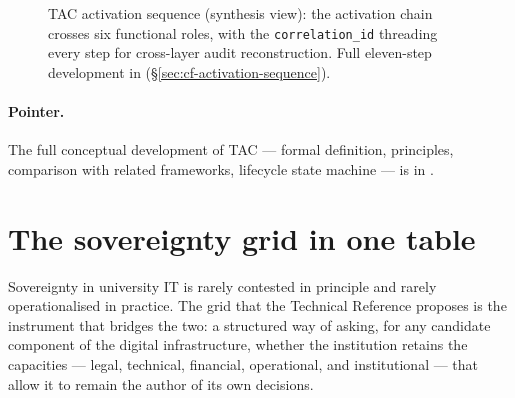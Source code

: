 \begin{figure}[H]
\centering
{}
\caption{TAC activation sequence (synthesis view): the activation
chain crosses six functional roles, with the
\texttt{correlation\_id} threading every step for cross-layer
audit reconstruction. Full eleven-step development in
 (\S\ref{sec:cf-activation-sequence}).}
\label{fig:synth-tac-sequence}
\end{figure}

\paragraph{Pointer.} The full conceptual development of TAC ---
formal definition, principles, comparison with related
frameworks, lifecycle state machine --- is in
.

\section{The sovereignty grid in one table}
\label{sec:synth-sovereignty}

Sovereignty in university IT is rarely contested in principle and
rarely operationalised in practice. The grid that the Technical
Reference proposes is the instrument that bridges the two: a
structured way of asking, for any candidate component of the
digital infrastructure, whether the institution retains the
capacities --- legal, technical, financial, operational, and
institutional --- that allow it to remain the author of its own
decisions.


